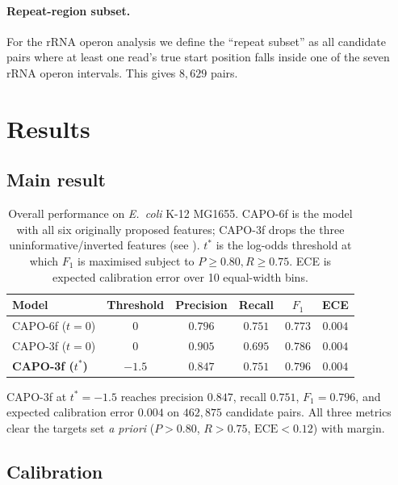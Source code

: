 \documentclass[11pt]{article}
\begin{document}
\paragraph{Repeat-region subset.} For the rRNA operon analysis we define the
``repeat subset'' as all candidate pairs where at least one read's true
start position falls inside one of the seven rRNA operon intervals. This
gives $8{,}629$ pairs.

\section{Results}

\subsection{Main result}

\begin{table}[h]
\centering
\caption{Overall performance on \textit{E.\ coli} K-12 MG1655. CAPO-6f is
the model with all six originally proposed features; CAPO-3f drops the
three uninformative/inverted features (see ). $t^*$ is
the log-odds threshold at which $F_1$ is maximised subject to
$P \ge 0.80, R \ge 0.75$. ECE is expected calibration error over 10 equal-width bins.}
\label{tab:main}
\begin{tabular}{lccccc}
\toprule
Model & Threshold & Precision & Recall & $F_1$ & ECE \\
\midrule
CAPO-6f ($t = 0$) & $0$    & $0.796$ & $0.751$ & $0.773$ & $0.004$ \\
CAPO-3f ($t = 0$) & $0$    & $0.905$ & $0.695$ & $0.786$ & $0.004$ \\
\textbf{CAPO-3f ($t^*$)} & $-1.5$ & $\mathbf{0.847}$ & $\mathbf{0.751}$ & $\mathbf{0.796}$ & $\mathbf{0.004}$ \\
\bottomrule
\end{tabular}
\end{table}

CAPO-3f at $t^* = -1.5$ reaches precision $0.847$, recall $0.751$, $F_1 =
0.796$, and expected calibration error $0.004$ on $462{,}875$ candidate
pairs. All three metrics clear the targets set \textit{a priori}
($P > 0.80$, $R > 0.75$, $\mathrm{ECE} < 0.12$) with margin.

\subsection{Calibration}
\label{sec:calibration-results}
\end{document}
